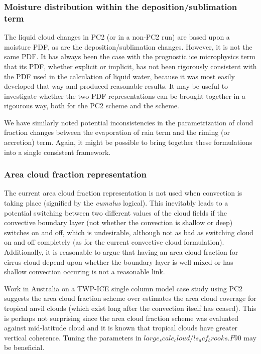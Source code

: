 \documentclass{UMDP_article}
\begin{document}
\subsubsection{Moisture distribution within the deposition/sublimation term}
The liquid cloud changes in PC2 (or in a non-PC2 run) are based upon
a moisture PDF, as are the deposition/sublimation changes. However, it is
not the same PDF. It has always been the case with the prognostic ice
microphysics term that its PDF, whether explicit or implicit, has not
been rigorously consistent with the PDF used in the calculation of liquid
water, because it was most easily developed that way and produced reasonable
results. It may be useful to investigate whether the two PDF
representations can be brought together in a rigourous way, both for the PC2
scheme and the \cite{smith90} scheme.

We have similarly noted potential inconsistencies in the parametrization
of cloud fraction changes between the evaporation of rain term and the
riming (or accretion) term. Again, it might be possible to bring together
these formulations into a single consistent framework.

\subsubsection{Area cloud fraction representation}
The current area cloud fraction representation is not used when
convection is taking place (signified by the \textit{cumulus} logical).
This inevitably leads to a potential switching between two different values
of the cloud fields if the convective boundary layer (not whether the
convection is shallow or deep) switches on and off, which is undesirable,
although not as bad as switching cloud on and off completely (as for the
current convective cloud formulation). Additionally, it is reasonable to argue that
having an area cloud fraction for cirrus cloud depend upon whether the boundary
layer is well mixed or has shallow convection occuring is not a reasonable link.

Work in Australia on a TWP-ICE single column model case study using PC2
suggests the area cloud fraction scheme over estimates the area cloud coverage
for tropical anvil clouds (which exist long after the convection itself has
ceased). This is perhaps not surprising since the \cite{bhi05} area
cloud fraction scheme was evaluated against mid-latitude cloud and it is
known that tropical clouds have greater vertical coherence. Tuning the
parameters in $large_scale_cloud/ls_acf_brooks.F90$ may be beneficial.
\end{document}
